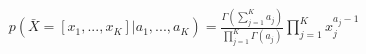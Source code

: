 $$
\begin{align*}
p(\bar{X}=[x_1, ..., x_K] | a_1, ..., a_K) = \frac{\Gamma(\sum_{j=1}^K a_j)}{\prod_{j=1}^K \Gamma(a_j)}\prod_{j=1}^K x_j^{a_j - 1}
\end{align*}
$$